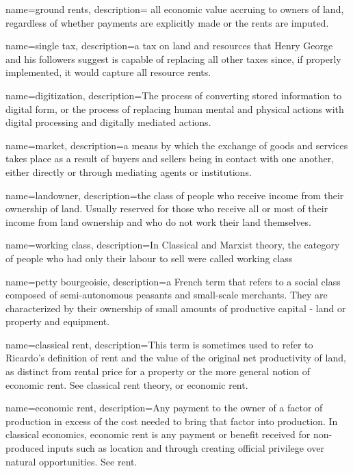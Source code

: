 {
name=ground rents,
description={ all economic value accruing to owners of land, regardless of whether payments are explicitly made or the rents are imputed.}
}

{
name=single tax,
description={a tax on land and resources that Henry George and his followers suggest is capable of replacing all other taxes since, if properly implemented, it would capture all resource rents. }
}

{
name=digitization,
description={The process of converting stored information to digital form, or the process of replacing human mental and physical actions with digital processing and digitally mediated actions.}
}

{
name=market,
description={a means by which the exchange of goods and services takes place as a result of buyers and sellers being in contact with one another, either directly or through mediating agents or institutions.}%
}

{
name=landowner,
description={the class of people who receive income from their ownership of land. Usually reserved for those who receive all or most of their income from land ownership and who do not work their land themselves.}
}

{
name=working class,
description={In Classical and Marxist theory, the category of people who had only their labour to sell were called working class}
}


{
name=petty bourgeoisie,
description={a French term that refers to a social class composed of semi-autonomous peasants and small-scale merchants. They are characterized by their ownership of small amounts of productive capital - land or property and equipment.}
}

{
name=classical rent,
description={This term is sometimes used to refer to Ricardo's definition of rent and the value of the original net productivity of land, as distinct from rental price for a property or the more general notion of economic rent. See \gls{classical rent theory}, or \gls{economic rent}.}
}

{
name=economic rent,
description={Any payment to the owner of a factor of production in excess of the cost needed to bring that factor into production. In classical economics, economic rent is any payment or benefit received for non-produced inputs such as location and through creating official privilege over natural opportunities. See \gls{rent}.}
}

